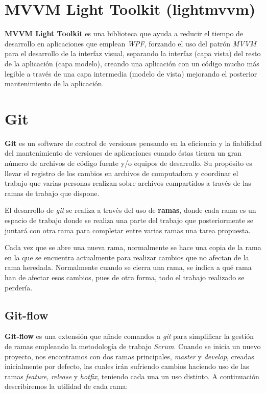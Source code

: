 \documentclass[pdftex,11pt,a4paper]{book}
\begin{document}
\section{MVVM Light Toolkit (lightmvvm)}

\textbf{MVVM Light Toolkit} \cite{mvvmlight} es una biblioteca que ayuda a reducir el tiempo de desarrollo en aplicaciones que emplean \emph{WPF}, forzando el uso del patrón \emph{MVVM} para el desarrollo de la interfaz visual, separando la interfaz (capa vista) del resto de la aplicación (capa modelo), creando una aplicación con un código mucho más legible a través de una capa intermedia (modelo de vista) mejorando el posterior mantenimiento de la aplicación.


\section{Git}

\textbf{Git} \cite{git} es un software de control de versiones pensando en la eficiencia y la fiabilidad del mantenimiento de versiones de aplicaciones cuando éstas tienen un gran número de archivos de código fuente y/o equipos de desarrollo. Su propósito es llevar el registro de los cambios en archivos de computadora y coordinar el trabajo que varias personas realizan sobre archivos compartidos a través de las ramas de trabajo que dispone.

El desarrollo de \emph{git} se realiza a través del uso de \textbf{ramas}, donde cada rama es un espacio de trabajo donde se realiza una parte del trabajo que posteriormente se juntará con otra rama para completar entre varias ramas una tarea propuesta.

Cada vez que se abre una nueva rama, normalmente se hace una copia de la rama en la que se encuentra actualmente para realizar cambios que no afectan de la rama heredada. Normalmente cuando se cierra una rama, se indica a qué rama han de afectar esos cambios, pues de otra forma, todo el trabajo realizado se perdería.

\subsection{Git-flow}

\textbf{Git-flow} es una extensión que añade comandos a \textit{git} para simplificar la gestión de ramas empleando la metodología de trabajo \textit{Scrum}. Cuando se inicia un nuevo proyecto, nos encontramos con dos ramas principales, \emph{master} y \emph{develop}, creadas inicialmente por defecto, las cuales irán sufriendo cambios haciendo uso de las ramas \emph{feature}, \emph{release} y \emph{hotfix}, teniendo cada una un uso distinto. A continuación describiremos la utilidad de cada rama:
\end{document}
